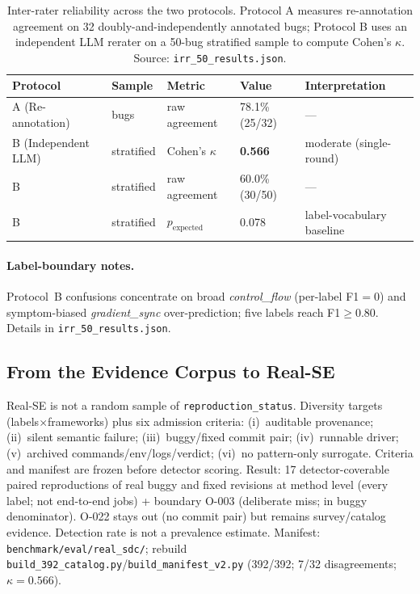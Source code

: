 \documentclass[sigconf,nonacm]{acmart}
\begin{document}
\begin{table}[H]
\centering
\caption{Inter-rater reliability across the two protocols. Protocol A measures re-annotation agreement on 32 doubly-and-independently annotated bugs; Protocol B uses an independent LLM rerater on a 50-bug stratified sample to compute Cohen's $\kappa$. Source: \texttt{irr\_50\_results.json}.}
\label{tab:irr}
\begin{tabularx}{\linewidth}{@{}>{\raggedright\arraybackslash}l >{\raggedright\arraybackslash}X l l >{\raggedright\arraybackslash}X@{}}
\toprule
Protocol & Sample & Metric & Value & Interpretation \\
\midrule
A (Re-annotation)      & 32 bugs        & raw agreement & 78.1\% (25/32) & --- \\
B (Independent LLM)    & 50 stratified  & Cohen's $\kappa$ & \textbf{0.566} & moderate (single-round) \\
B                      & 50 stratified  & raw agreement & 60.0\% (30/50) & --- \\
B                      & 50 stratified  & $p_{\text{expected}}$ & 0.078 & label-vocabulary baseline \\
\bottomrule
\end{tabularx}
\end{table}

\paragraph{Label-boundary notes.}
\label{app:method-limitation}
Protocol~B confusions concentrate on broad \textit{control\_flow}
(per-label F1${=}0$) and symptom-biased \textit{gradient\_sync} over-prediction;
five labels reach F1$\geq$0.80. Details in \texttt{irr\_50\_results.json}.

\subsection{From the Evidence Corpus to Real-SE}
\label{app:method-reproducibility}

Real-SE is not a random sample of
\texttt{reproduction\_status}. Diversity targets (labels$\times$frameworks)
plus six admission criteria: (i)~auditable provenance; (ii)~silent semantic
failure; (iii)~buggy/fixed commit pair; (iv)~runnable driver; (v)~archived
commands/env/logs/verdict; (vi)~no pattern-only surrogate. Criteria and
manifest are frozen before detector scoring. Result: 17 detector-coverable
paired reproductions of real buggy and fixed revisions at method level (every
label; not end-to-end jobs)
+ boundary O-003 (deliberate miss; in buggy denominator). O-022 stays out (no
commit pair) but remains survey/catalog evidence. Detection rate is not a
prevalence estimate. Manifest: \texttt{benchmark/eval/real\_sdc/}; rebuild
\texttt{build\_392\_catalog.py}/\texttt{build\_manifest\_v2.py} (392/392;
7/32 disagreements; $\kappa{=}0.566$).
\end{document}
